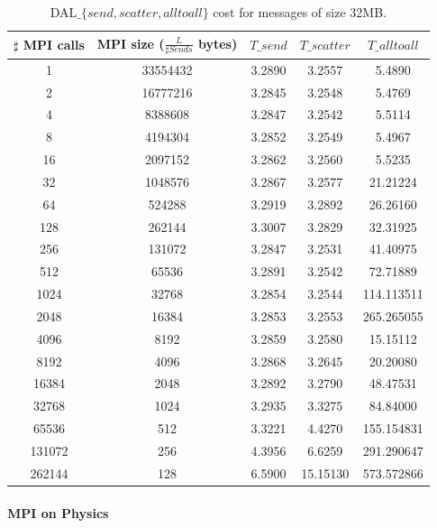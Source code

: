 \begin{table}[h]
\begin{center}
\begin{tabular}{|c|c|c|c|c|}\hline
\hline
$\sharp$ MPI calls & MPI size ($\frac{L}{\sharp Sends}$ bytes)  & $T\_send$   & $T\_scatter$  & $T\_alltoall$      \\\hline\hline
1 & 33554432 & 3.2890 & 3.2557 & 5.4890 \\\hline
2 & 16777216 & 3.2845 & 3.2548 & 5.4769 \\\hline
4 & 8388608 & 3.2847 & 3.2542 & 5.5114 \\\hline
8 & 4194304 & 3.2852 & 3.2549 & 5.4967 \\\hline
16 & 2097152 & 3.2862 & 3.2560 & 5.5235 \\\hline
32 & 1048576 & 3.2867 & 3.2577 & 21.21224 \\\hline
64 & 524288 & 3.2919 & 3.2892 & 26.26160 \\\hline
128 & 262144 & 3.3007 & 3.2829 & 32.31925 \\\hline
256 & 131072 & 3.2847 & 3.2531 & 41.40975 \\\hline
512 & 65536 & 3.2891 & 3.2542 & 72.71889 \\\hline
1024 & 32768 & 3.2854 & 3.2544 & 114.113511 \\\hline
2048 & 16384 & 3.2853 & 3.2553 & 265.265055 \\\hline
4096 & 8192 & 3.2859 & 3.2580 & 15.15112 \\\hline
8192 & 4096 & 3.2868 & 3.2645 & 20.20080 \\\hline
16384 & 2048 & 3.2892 & 3.2790 & 48.47531 \\\hline
32768 & 1024 & 3.2935 & 3.3275 & 84.84000 \\\hline
65536 & 512 & 3.3221 & 4.4270 & 155.154831 \\\hline
131072 & 256 & 4.3956 & 6.6259 & 291.290647 \\\hline
262144 & 128 & 6.5900 & 15.15130 & 573.572866 \\\hline
\end{tabular}
\caption{DAL$\_\lbrace send, scatter, alltoall \rbrace$ cost for messages of size 32MB. }
\label{tsetup-impact}
\end{center}
\end{table}


\paragraph{MPI on Physics}

